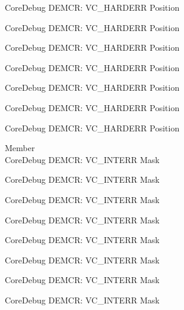 \begin{DoxyRefList}
\label{deprecated__deprecated000794}%
%
Core\+Debug DEMCR\+: VC\+\_\+\+HARDERR Position 

\label{deprecated__deprecated000858}%
%
Core\+Debug DEMCR\+: VC\+\_\+\+HARDERR Position 

\label{deprecated__deprecated000933}%
%
Core\+Debug DEMCR\+: VC\+\_\+\+HARDERR Position 

\label{deprecated__deprecated001000}%
%
Core\+Debug DEMCR\+: VC\+\_\+\+HARDERR Position 

\label{deprecated__deprecated001076}%
%
Core\+Debug DEMCR\+: VC\+\_\+\+HARDERR Position 

\label{deprecated__deprecated001165}%
%
Core\+Debug DEMCR\+: VC\+\_\+\+HARDERR Position 

\label{deprecated__deprecated001267}%
%
Core\+Debug DEMCR\+: VC\+\_\+\+HARDERR Position  
\item[Member \doxylink{group___c_m_s_i_s___core_debug_gad6815d8e3df302d2f0ff2c2c734ed29a}{Core\+Debug\+\_\+\+DEMCR\+\_\+\+VC\+\_\+\+INTERR\+\_\+\+Msk} ]\hfill \\
\label{deprecated__deprecated000058}%
%
Core\+Debug DEMCR\+: VC\+\_\+\+INTERR Mask 

\label{deprecated__deprecated000202}%
%
Core\+Debug DEMCR\+: VC\+\_\+\+INTERR Mask 

\label{deprecated__deprecated000344}%
%
Core\+Debug DEMCR\+: VC\+\_\+\+INTERR Mask 

\label{deprecated__deprecated000420}%
%
Core\+Debug DEMCR\+: VC\+\_\+\+INTERR Mask 

\label{deprecated__deprecated000509}%
%
Core\+Debug DEMCR\+: VC\+\_\+\+INTERR Mask 

\label{deprecated__deprecated000611}%
%
Core\+Debug DEMCR\+: VC\+\_\+\+INTERR Mask 

\label{deprecated__deprecated000717}%
%
Core\+Debug DEMCR\+: VC\+\_\+\+INTERR Mask 

\label{deprecated__deprecated000861}%
%
Core\+Debug DEMCR\+: VC\+\_\+\+INTERR Mask 


\end{DoxyRefList}
